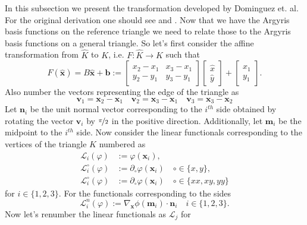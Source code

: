 In this subsection we present the transformation developed by Dominguez et. al.
For the original derivation one should see \cite{Dominguez06} and
\cite{Dominguez08}. Now that we have the Argyris basis functions on the
reference triangle we need to relate those to the Argyris basis functions on a
general triangle. So let's first consider the affine transformation from
$\hat{K}$ to $K$, i.e. $F: \hat{K} \to K$ such that
\begin{equation}
  F(\hat{\mathbf{x}}) = B\hat{\mathbf{x}} + \mathbf{b} :=
  \begin{bmatrix}
    x_2 - x_1 & x_3 - x_1 \\ y_2 - y_1 & y_3 - y_1
  \end{bmatrix} \begin{bmatrix}
    \hat{x} \\ \hat{y}
  \end{bmatrix} + \begin{bmatrix}
    x_1 \\ y_1
  \end{bmatrix}.
  \label{eqn:Affine}
\end{equation}
Also number the vectors representing the edge of the triangle as
\begin{equation*}
  \mathbf{v}_1 = \mathbf{x}_2 - \mathbf{x}_1\quad \mathbf{v}_2 = \mathbf{x}_3 -
  \mathbf{x}_1\quad \mathbf{v}_3 = \mathbf{x}_3 - \mathbf{x}_2
\end{equation*}
Let $\mathbf{n}_i$ be the unit normal vector corresponding to the $i^{th}$ side obtained by
rotating the vector $\mathbf{v}_i$ by $\nicefrac{\pi}{2}$ in the positive
direction. Additionally, let $\mathbf{m}_i$ be the midpoint to the $i^{th}$
side.
Now consider the linear functionals corresponding to the vertices of the
triangle $K$ numbered as
\begin{align*}
  \mathcal{L}_i(\varphi) &:= \varphi(\mathbf{x}_i), \\
  \mathcal{L}_i^\circ(\varphi) &:= \partial_\circ \varphi(\mathbf{x}_i) \quad \circ \in
    \{x,y\}, \\
  \mathcal{L}_i^\circ(\varphi) &:= \partial_\circ \varphi(\mathbf{x}_i) \quad \circ \in
    \{xx,xy,yy\}
\end{align*}
for $i\in \{1,2,3\}$. For the functionals corresponding to the sides
\begin{equation*}
  \mathcal{L}_i^n(\varphi) := \nabla_{\mathbf{x}} \phi(\mathbf{m}_i) \cdot
  \mathbf{n}_i \quad i\in\{1,2,3\}.
\end{equation*}
Now let's renumber the linear functionals as $\mathcal{L}_j$ for
